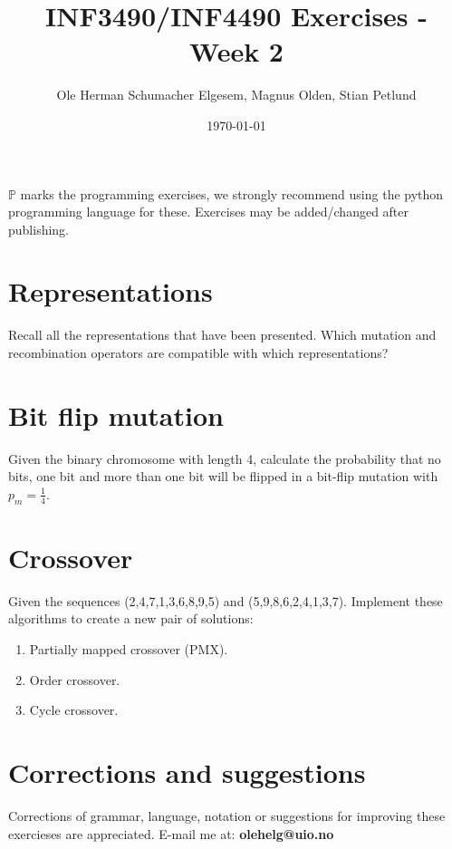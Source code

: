 \documentclass{article}           %
\title{\vspace{-2cm}INF3490/INF4490 Exercises - Week 2}
\author{Ole Herman Schumacher Elgesem, Magnus Olden, Stian Petlund}
\date{\today}
\newcommand\marginsymbol[1][0pt]{%
  \tabto*{0cm}\makebox[\dimexpr-1cm-#1\relax][r]{$\mathbb{P}$}\tabto*{\TabPrevPos}}
\begin{document}
    \renewcommand\marginsymbol[1][0pt]{%
  \tabto*{0cm}\makebox[-1cm][c]{$\mathbb{P}$}\tabto*{\TabPrevPos}}

\maketitle
\(\mathbb{P}\) marks the programming exercises, we strongly recommend using
the python programming language for these. Exercises may be added/changed
after publishing.

\section{Representations}
Recall all the representations that have been presented. Which mutation and
recombination operators are compatible with which representations?

\section{Bit flip mutation}
Given the binary chromosome with length 4, calculate the probability that no
bits, one bit and more than one bit will be flipped in a bit-flip mutation with
\(p_m = \frac{1}{4}\).

\section{Crossover \marginsymbol}
Given the sequences (2,4,7,1,3,6,8,9,5) and (5,9,8,6,2,4,1,3,7). Implement
these algorithms to create a new pair of solutions:
\renewcommand{\theenumi}{\alph{enumi}}
\begin{enumerate}
  \item Partially mapped crossover (PMX).
  \item Order crossover.
  \item Cycle crossover.
\end{enumerate}

\section*{Corrections and suggestions}
Corrections of grammar, language, notation or suggestions for improving these
exercieses are appreciated. E-mail me at: \textbf{olehelg@uio.no}
\end{document}

